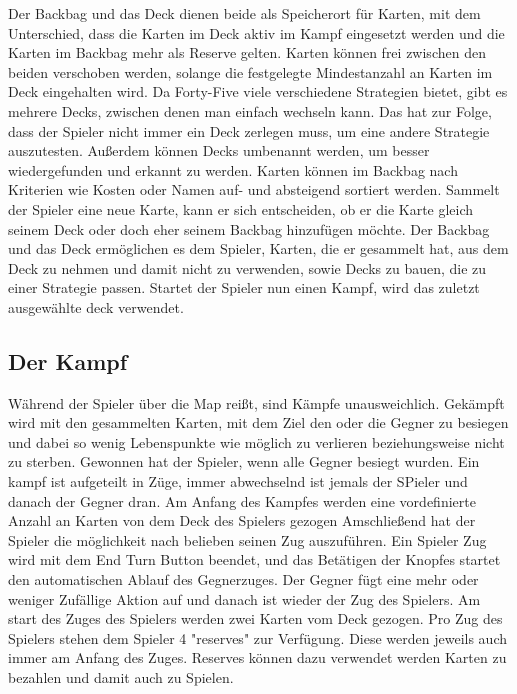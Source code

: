 Der Backbag und das Deck dienen beide als Speicherort für Karten, mit dem Unterschied, dass die Karten im Deck aktiv im
Kampf eingesetzt werden und die Karten im Backbag mehr als Reserve gelten.
Karten können frei zwischen den beiden verschoben werden, solange die festgelegte Mindestanzahl an Karten im Deck eingehalten wird.
Da Forty-Five viele verschiedene Strategien bietet, gibt es mehrere Decks, zwischen denen man einfach wechseln kann.
Das hat zur Folge, dass der Spieler nicht immer ein Deck zerlegen muss, um eine andere Strategie auszutesten.
Außerdem können Decks umbenannt werden, um besser wiedergefunden und erkannt zu werden.
Karten können im Backbag nach Kriterien wie Kosten oder Namen auf- und absteigend sortiert werden.
Sammelt der Spieler eine neue Karte, kann er sich entscheiden, ob er die Karte gleich seinem Deck oder doch eher seinem
Backbag hinzufügen möchte.
Der Backbag und das Deck ermöglichen es dem Spieler, Karten, die er gesammelt hat, aus dem Deck zu nehmen und damit
nicht zu verwenden, sowie Decks zu bauen, die zu einer Strategie passen.
Startet der Spieler nun einen Kampf, wird das zuletzt ausgewählte deck verwendet.


\subsection{Der Kampf}\label{backpack_and_deck}

Während der Spieler über die Map reißt, sind Kämpfe unausweichlich. Gekämpft wird mit den gesammelten Karten, mit dem
Ziel den oder die Gegner zu besiegen und dabei so wenig Lebenspunkte wie möglich zu verlieren beziehungsweise nicht zu sterben.
Gewonnen hat der Spieler, wenn alle Gegner besiegt wurden.
Ein kampf ist aufgeteilt in Züge, immer abwechselnd ist jemals der SPieler und danach der Gegner dran. Am Anfang des Kampfes werden
eine vordefinierte Anzahl an Karten von dem Deck des Spielers gezogen %
Amschließend hat der Spieler die möglichkeit nach belieben seinen Zug auszuführen.
Ein Spieler Zug wird mit dem End Turn Button beendet, und das Betätigen der Knopfes startet den automatischen Ablauf des Gegnerzuges.
Der Gegner fügt eine mehr oder weniger Zufällige Aktion auf und danach ist wieder der Zug des Spielers.
Am start des Zuges des Spielers werden zwei Karten vom Deck gezogen.
Pro Zug des Spielers stehen dem Spieler 4 "reserves" zur Verfügung. Diese werden jeweils auch immer am Anfang des Zuges.
Reserves können dazu verwendet werden Karten zu bezahlen und damit auch zu Spielen.


